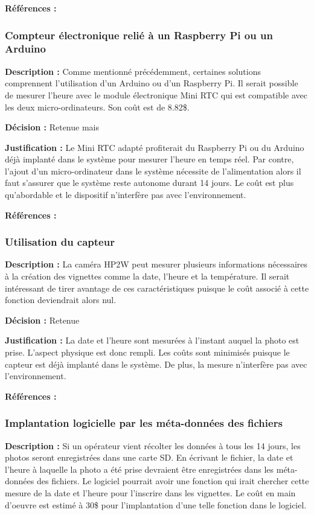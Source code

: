 \textbf{Références :} \cite{Datetime}

\subsubsection{Compteur électronique relié à un Raspberry Pi ou un Arduino}

\textbf{Description :} Comme mentionné précédemment, certaines solutions comprennent l'utilisation d'un Arduino ou d'un Raspberry Pi. Il serait possible de mesurer l'heure avec le module électronique Mini RTC qui est compatible avec les deux micro-ordinateurs. Son coût est de 8.82\$.

\textbf{Décision :} Retenue mais

\textbf{Justification :} Le Mini RTC adapté profiterait du Raspberry Pi ou du Arduino déjà implanté dans le système pour mesurer l'heure en temps réel. Par contre, l'ajout d'un micro-ordinateur dans le système nécessite de l'alimentation alors il faut s'assurer que le système reste autonome durant 14 jours. Le coût est plus qu'abordable et le dispositif n'interfère pas avec l'environnement.

\textbf{Références :} \cite{Timer}


\subsubsection{Utilisation du capteur}

\textbf{Description :} La caméra HP2W peut mesurer plusieurs informations nécessaires à la création des vignettes comme la date, l'heure et la température. Il serait intéressant de tirer avantage de ces caractéristiques puisque le coût associé à cette fonction deviendrait alors nul.


\textbf{Décision :} Retenue

\textbf{Justification :} La date et l'heure sont mesurées à l'instant auquel la photo est prise. L'aspect physique est donc rempli. Les coûts sont minimisés puisque le capteur est déjà implanté dans le système. De plus, la mesure n'interfère pas avec l'environnement.

\textbf{Références :} \cite{HP2W}

\subsubsection{Implantation logicielle par les méta-données des fichiers}

\textbf{Description :} Si un opérateur vient récolter les données à tous les 14 jours, les photos seront enregistrées dans une carte SD. En écrivant le fichier, la date et l'heure à laquelle la photo a été prise devraient être enregistrées dans les méta-données des fichiers. Le logiciel pourrait avoir une fonction qui irait chercher cette mesure de la date et l'heure pour l'inscrire dans les vignettes. Le coût en main d'oeuvre est estimé à 30\$ pour l'implantation d'une telle fonction dans le logiciel.

